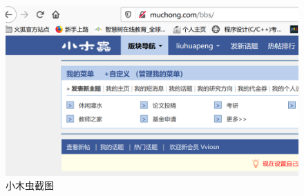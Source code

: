 \documentclass{article}
\begin{document}
\begin{figure}[h!]
	\centering
	\includegraphics[scale=0.5]{20191128000651}
	\caption{小木虫截图}
	\label{fig:ggwwrqc.jpg}
\end{figure}
\end{document}
